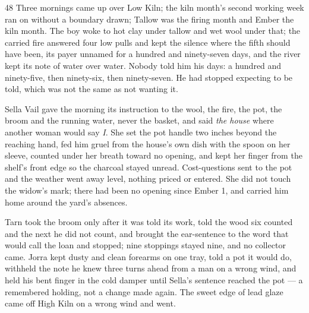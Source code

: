
\scenebreak


\scenebreak


\scenebreak

\CRtailpiece
\begin{CRchronicle}{48}
Three mornings came up over Low Kiln; the kiln month’s second working week ran on without a boundary drawn; Tallow was the firing month and Ember the kiln month. The boy woke to hot clay under tallow and wet wool under that; the carried fire answered four low pulls and kept the silence where the fifth should have been, its payer unnamed for a hundred and ninety-seven days, and the river kept its note of water over water. Nobody told him his days: a hundred and ninety-five, then ninety-six, then ninety-seven. He had stopped expecting to be told, which was not the same as not wanting it.

Sella Vail gave the morning its instruction to the wool, the fire, the pot, the broom and the running water, never the basket, and said \emph{the house} where another woman would say \emph{I}. She set the pot handle two inches beyond the reaching hand, fed him gruel from the house’s own dish with the spoon on her sleeve, counted under her breath toward no opening, and kept her finger from the shelf’s front edge so the charcoal stayed unread. Cost-questions sent to the pot and the weather went away level, nothing priced or entered. She did not touch the widow’s mark; there had been no opening since Ember 1, and carried him home around the yard’s absences.

Tarn took the broom only after it was told its work, told the wood six counted and the next he did not count, and brought the ear-sentence to the word that would call the loan and stopped; nine stoppings stayed nine, and no collector came. Jorra kept dusty and clean forearms on one tray, told a pot it would do, withheld the note he knew three turns ahead from a man on a wrong wind, and held his bent finger in the cold damper until Sella’s sentence reached the pot --- a remembered holding, not a change made again. The sweet edge of lead glaze came off High Kiln on a wrong wind and went.


\end{CRchronicle}
